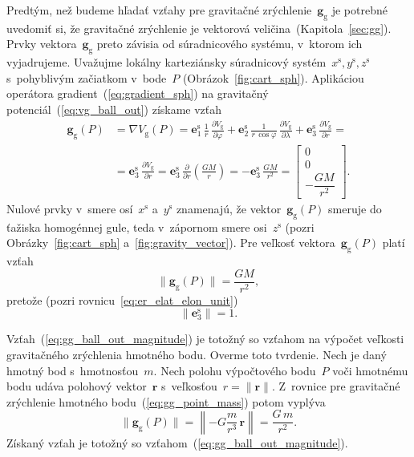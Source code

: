 \documentclass[a4paper, 12pt]{book}
\newcommand{\gidx}{\mathrm g}
\let\vec\mathbf
\begin{document}
Predtým, než budeme hľadať vzťahy pre gravitačné zrýchlenie~$\vec g_\gidx$ je 
potrebné uvedomiť si, že gravitačné zrýchlenie je vektorová 
veličina~(Kapitola~\ref{sec:gg}).  Prvky vektora~$\vec g_\gidx$ preto závisia 
od súradnicového systému, v~ktorom ich vyjadrujeme.  Uvažujme lokálny 
karteziánsky súradnicový systém~$x^\mathrm{s}, y^\mathrm{s}, z^\mathrm{s}$ 
s~pohyblivým začiatkom v~bode~$P$ (Obrázok~\ref{fig:cart_sph}).  Aplikáciou 
operátora gradient~(\ref{eq:gradient_sph}) na gravitačný 
potenciál~(\ref{eq:vg_ball_out}) získame vzťah
%
\begin{equation}
\label{eq:gg_ball}
\begin{split}
\vec g_\gidx(P) &= \nabla V_\gidx(P) = \vec e_1^\mathrm{s} \, \frac{1}{r} \, 
\frac{\partial V_\gidx}{\partial \varphi} + \vec e_2^\mathrm{s} \, \frac{1}{r 
\, \cos\varphi} \, \frac{\partial V_\gidx}{\partial \lambda} + \vec 
e_3^\mathrm{s} \, \frac{\partial V_\gidx}{\partial r} =\\
%
&=\vec e_3^\mathrm{s} \, \frac{\partial V_\gidx}{\partial r} = \vec 
e_3^\mathrm{s} \, \frac{\partial}{\partial r}\left( \frac{GM}{r} \right) 
= -\vec e_3^\mathrm{s} \, \frac{GM}{r^2}
%
=
%
\begin{bmatrix}
0\\
0\\
-\dfrac{GM}{r^2}
\end{bmatrix}
%
{.}
\end{split}
\end{equation}
%
Nulové prvky v~smere osí~$x^\mathrm{s}$ a~$y^\mathrm{s}$ znamenajú, že 
vektor~$\vec g_\gidx(P)$ smeruje do ťažiska homogénnej gule, teda v~zápornom 
smere osi~$z^\mathrm{s}$ (pozri Obrázky~\ref{fig:cart_sph} 
a~\ref{fig:gravity_vector}).  Pre veľkosť vektora~$\vec g_\gidx(P)$ platí vzťah
%
\begin{equation}
\label{eq:gg_ball_out_magnitude}
\| \vec g_\gidx(P) \| = \frac{GM}{r^2}{,}
\end{equation}
%
pretože (pozri rovnicu~\ref{eq:er_elat_elon_unit})
%
\begin{equation}
\| \vec e_3^\mathrm{s} \| = 1{.}
\end{equation}

Vzťah~(\ref{eq:gg_ball_out_magnitude}) je totožný so vzťahom na výpočet 
veľkosti gravitačného zrýchlenia hmotného bodu.  Overme toto tvrdenie.  Nech je 
daný hmotný bod s~hmotnosťou~$m$.  Nech polohu výpočtového bodu~$P$ voči 
hmotnému bodu udáva polohový vektor~$\vec r$ s~veľkosťou~$r = \| \vec r \|$.  
Z~rovnice pre gravitačné zrýchlenie hmotného bodu~(\ref{eq:gg_point_mass}) 
potom vyplýva
%
\begin{equation}
\| \vec g_\gidx(P) \| = \left\lVert -G \frac{m}{r^3} \, \vec r \right\rVert 
= \frac{G \, m}{r^2}{.}
\end{equation}
%
Získaný vzťah je totožný so vzťahom~(\ref{eq:gg_ball_out_magnitude}).
\end{document}
